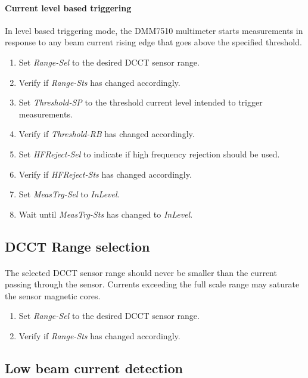 \documentclass[openany]{article}
\begin{document}
		\paragraph{Current level based triggering} In level based triggering mode, the DMM7510 multimeter starts measurements in response to any beam current rising edge that goes above the specified threshold.

			\begin{enumerate}
			\item Set \emph{Range-Sel} to the desired DCCT sensor range.
			\item Verify if \emph{Range-Sts} has changed accordingly.
			\item Set \emph{Threshold-SP} to the threshold current level intended to trigger measurements.
			\item Verify if \emph{Threshold-RB} has changed accordingly.
			\item Set \emph{HFReject-Sel} to indicate if high frequency rejection should be used.
			\item Verify if \emph{HFReject-Sts} has changed accordingly.
			\item Set \emph{MeasTrg-Sel} to \emph{InLevel}.
			\item Wait until \emph{MeasTrg-Sts} has changed to \emph{InLevel}.
			\end{enumerate}

	\subsection{DCCT Range selection}

		\paragraph{} The selected DCCT sensor range should never be smaller than the current passing through the sensor. Currents exceeding the full scale range may saturate the sensor magnetic cores.

			\begin{enumerate}
			\item Set \emph{Range-Sel} to the desired DCCT sensor range.
			\item Verify if \emph{Range-Sts} has changed accordingly.
			\end{enumerate}

	\subsection{Low beam current detection}
\end{document}
